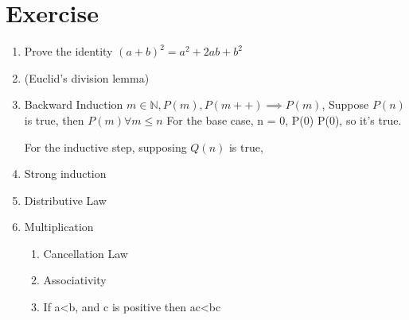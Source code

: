\documentclass[11pt]{report}
\begin{document}
\section{Exercise}
\label{sec:org04399c8}
\begin{enumerate}
\item Prove the identity \((a+b)^2 = a^2 + 2ab + b^2\)
\label{sec:org6c01fb7}
\item (Euclid's division lemma)
\label{sec:org05b2b1b}
\item Backward Induction
\label{sec:org20ac174}
\(m \in \mathbb{N}, P(m), P(m++) \implies P(m)\), Suppose \(P(n)\) is true, then \(P(m) \forall m \le n\)
For the base case, n = 0,
P(0) \implies P(0), so it's true.

For the inductive step, supposing \(Q(n)\) is true,
\item Strong induction
\label{sec:orge5810cf}
\item Distributive Law
\label{sec:orgc72cdaa}
\item Multiplication
\label{sec:org063a63b}
\begin{enumerate}
\item Cancellation Law
\label{sec:org6687170}
\item Associativity
\label{sec:org823e8e3}
\item If a<b, and c is positive then ac<bc
\label{sec:org7b0c355}
\end{enumerate}
\end{enumerate}
\end{document}
